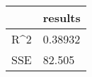 \begin{tabular}{ll}
& results \\ 
\hline 
R\^{}2 & 0.38932 \\ 
SSE & 82.505 \\ 
\hline 
\end{tabular}